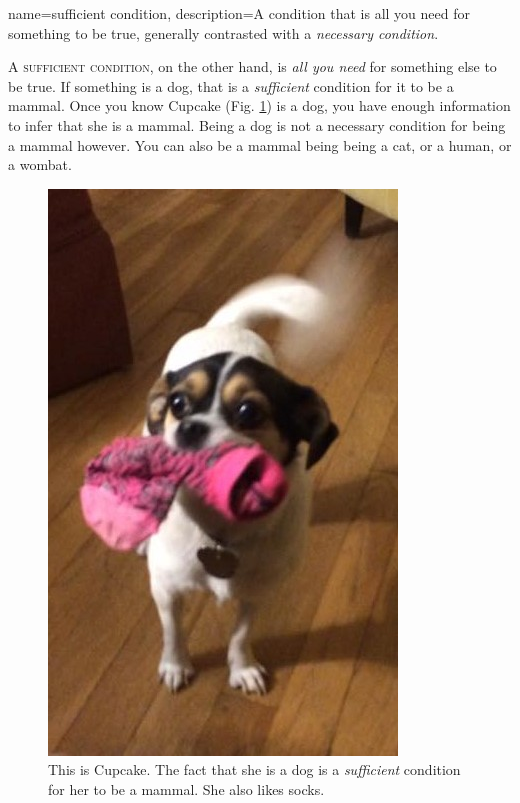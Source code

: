 {
name=sufficient condition,
description={A condition that is all you need for something to be true, generally contrasted with a \textit{necessary condition}.}
}

A \textsc{\gls{sufficient condition}}\label{def:sufficient_condition}, on the other hand, is \textit{all you need} for something else to be true. If something is a dog, that is a \textit{sufficient} condition for it to be a mammal. Once you know Cupcake (Fig. \ref{fig:cupcake}) is a dog, you have enough information to infer that she is a mammal. Being a dog is not a necessary condition for being a mammal however. You can also be a mammal being being a cat, or a human, or a wombat. 

\begin{figure}
\begin{mdframed}[style=mytableclearbox]
\begin{center}
\includegraphics*{img/cupcake}
\end{center}
\end{mdframed}
\caption{This is Cupcake. The fact that she is a dog is a \textit{sufficient} condition for her to be a mammal. She also likes socks.}
\label{fig:cupcake}
\end{figure}

